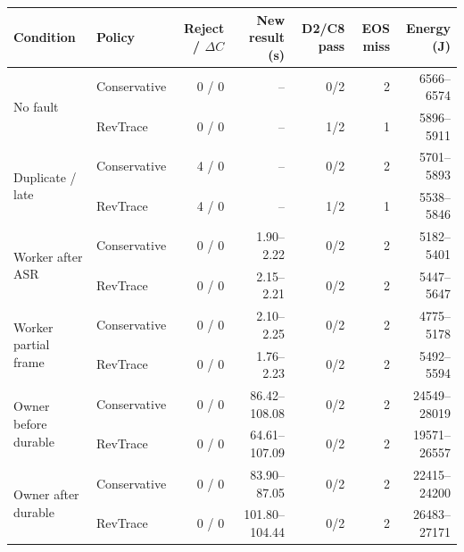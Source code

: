 \begin{tabular}{@{}llrrrrr@{}}
\toprule
Condition & Policy & Reject / $\Delta C$ & New result (s) & D2/C8 pass & EOS miss & Energy (J) \\
\midrule
\multirow{2}{*}{No fault} & Conservative & 0 / 0 & -- & 0/2 & 2 & 6566--6574 \\
 & RevTrace & 0 / 0 & -- & 1/2 & 1 & 5896--5911 \\
\multirow{2}{*}{Duplicate / late} & Conservative & 4 / 0 & -- & 0/2 & 2 & 5701--5893 \\
 & RevTrace & 4 / 0 & -- & 1/2 & 1 & 5538--5846 \\
\multirow{2}{*}{Worker after ASR} & Conservative & 0 / 0 & 1.90--2.22 & 0/2 & 2 & 5182--5401 \\
 & RevTrace & 0 / 0 & 2.15--2.21 & 0/2 & 2 & 5447--5647 \\
\multirow{2}{*}{Worker partial frame} & Conservative & 0 / 0 & 2.10--2.25 & 0/2 & 2 & 4775--5178 \\
 & RevTrace & 0 / 0 & 1.76--2.23 & 0/2 & 2 & 5492--5594 \\
\multirow{2}{*}{Owner before durable} & Conservative & 0 / 0 & 86.42--108.08 & 0/2 & 2 & 24549--28019 \\
 & RevTrace & 0 / 0 & 64.61--107.09 & 0/2 & 2 & 19571--26557 \\
\multirow{2}{*}{Owner after durable} & Conservative & 0 / 0 & 83.90--87.05 & 0/2 & 2 & 22415--24200 \\
 & RevTrace & 0 / 0 & 101.80--104.44 & 0/2 & 2 & 26483--27171 \\
\bottomrule
\end{tabular}

